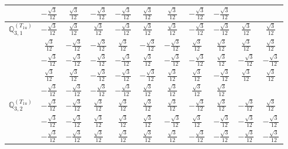 \documentclass[fleqn,10pt,landscape]{article}
\begin{document}
\begin{itemize}
{\begin{center}
\begin{longtable}{ccccccccccc}
& $ - \frac{\sqrt{3}}{12} $ & $ \frac{\sqrt{3}}{12} $ & $ - \frac{\sqrt{3}}{12} $ & $ - \frac{\sqrt{3}}{12} $ & $ \frac{\sqrt{3}}{12} $ & $ \frac{\sqrt{3}}{12} $ & $ - \frac{\sqrt{3}}{12} $ & $ - \frac{\sqrt{3}}{12} $ & $  $ & $  $ \\ \hline
$\mathbb{Q}_{3,1}^{(T_{1u})}$ & $ - \frac{\sqrt{3}}{12} $ & $ \frac{\sqrt{3}}{12} $ & $ \frac{\sqrt{3}}{12} $ & $ - \frac{\sqrt{3}}{12} $ & $ \frac{\sqrt{3}}{12} $ & $ \frac{\sqrt{3}}{12} $ & $ - \frac{\sqrt{3}}{12} $ & $ - \frac{\sqrt{3}}{12} $ & $ \frac{\sqrt{3}}{12} $ & $ \frac{\sqrt{3}}{12} $ \\
& $ \frac{\sqrt{3}}{12} $ & $ - \frac{\sqrt{3}}{12} $ & $ - \frac{\sqrt{3}}{12} $ & $ \frac{\sqrt{3}}{12} $ & $ - \frac{\sqrt{3}}{12} $ & $ - \frac{\sqrt{3}}{12} $ & $ \frac{\sqrt{3}}{12} $ & $ \frac{\sqrt{3}}{12} $ & $ \frac{\sqrt{3}}{12} $ & $ \frac{\sqrt{3}}{12} $ \\
& $ - \frac{\sqrt{3}}{12} $ & $ - \frac{\sqrt{3}}{12} $ & $ - \frac{\sqrt{3}}{12} $ & $ - \frac{\sqrt{3}}{12} $ & $ \frac{\sqrt{3}}{12} $ & $ - \frac{\sqrt{3}}{12} $ & $ - \frac{\sqrt{3}}{12} $ & $ \frac{\sqrt{3}}{12} $ & $ - \frac{\sqrt{3}}{12} $ & $ - \frac{\sqrt{3}}{12} $ \\
& $ \frac{\sqrt{3}}{12} $ & $ \frac{\sqrt{3}}{12} $ & $ - \frac{\sqrt{3}}{12} $ & $ - \frac{\sqrt{3}}{12} $ & $ - \frac{\sqrt{3}}{12} $ & $ \frac{\sqrt{3}}{12} $ & $ \frac{\sqrt{3}}{12} $ & $ - \frac{\sqrt{3}}{12} $ & $ \frac{\sqrt{3}}{12} $ & $ \frac{\sqrt{3}}{12} $ \\
& $ - \frac{\sqrt{3}}{12} $ & $ - \frac{\sqrt{3}}{12} $ & $ - \frac{\sqrt{3}}{12} $ & $ - \frac{\sqrt{3}}{12} $ & $ \frac{\sqrt{3}}{12} $ & $ \frac{\sqrt{3}}{12} $ & $ \frac{\sqrt{3}}{12} $ & $ \frac{\sqrt{3}}{12} $ & $  $ & $  $ \\ \hline
$\mathbb{Q}_{3,2}^{(T_{1u})}$ & $ - \frac{\sqrt{3}}{12} $ & $ - \frac{\sqrt{3}}{12} $ & $ \frac{\sqrt{3}}{12} $ & $ \frac{\sqrt{3}}{12} $ & $ \frac{\sqrt{3}}{12} $ & $ \frac{\sqrt{3}}{12} $ & $ - \frac{\sqrt{3}}{12} $ & $ \frac{\sqrt{3}}{12} $ & $ - \frac{\sqrt{3}}{12} $ & $ \frac{\sqrt{3}}{12} $ \\
& $ - \frac{\sqrt{3}}{12} $ & $ - \frac{\sqrt{3}}{12} $ & $ \frac{\sqrt{3}}{12} $ & $ \frac{\sqrt{3}}{12} $ & $ \frac{\sqrt{3}}{12} $ & $ - \frac{\sqrt{3}}{12} $ & $ \frac{\sqrt{3}}{12} $ & $ - \frac{\sqrt{3}}{12} $ & $ - \frac{\sqrt{3}}{12} $ & $ - \frac{\sqrt{3}}{12} $ \\
& $ - \frac{\sqrt{3}}{12} $ & $ - \frac{\sqrt{3}}{12} $ & $ \frac{\sqrt{3}}{12} $ & $ \frac{\sqrt{3}}{12} $ & $ \frac{\sqrt{3}}{12} $ & $ \frac{\sqrt{3}}{12} $ & $ - \frac{\sqrt{3}}{12} $ & $ - \frac{\sqrt{3}}{12} $ & $ - \frac{\sqrt{3}}{12} $ & $ - \frac{\sqrt{3}}{12} $ \\

\end{longtable}
\end{center}}
\end{itemize}
\end{document}
